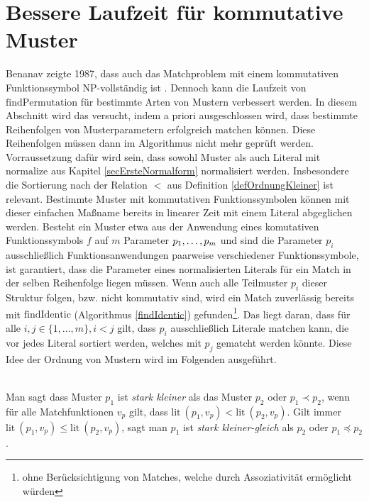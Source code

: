 \section{Bessere Laufzeit für kommutative Muster} \label{subsecCMuster}

Benanav zeigte 1987, dass auch das Matchproblem mit einem kommutativen Funktionssymbol NP-vollständig ist \cite{NPHardMatching}. Dennoch kann die Laufzeit von $\mathrm{findPermutation}$ für bestimmte Arten von Mustern verbessert werden. In diesem Abschnitt wird das versucht, indem a priori ausgeschlossen wird, dass bestimmte Reihenfolgen von Musterparametern erfolgreich matchen können. Diese Reihenfolgen müssen dann im Algorithmus nicht mehr geprüft werden.
Vorraussetzung dafür wird sein, dass sowohl Muster als auch Literal mit $\mathrm{normalize}$ aus Kapitel \ref{secErsteNormalform} normalisiert werden. Insbesondere die Sortierung nach der Relation $<$ aus Definition \ref{defOrdnungKleiner} ist relevant.
Bestimmte Muster mit kommutativen Funktionssymbolen können mit dieser einfachen Maßname bereits in linearer Zeit mit einem Literal abgeglichen werden. Besteht ein Muster etwa aus der Anwendung eines komutativen Funktionssymbols $f$ auf $m$ Parameter ${p}_{1}, \dots, {p}_{m}$ und sind die Parameter $p_i$ ausschließlich Funktionsanwendungen paarweise verschiedener Funktionssymbole, ist garantiert, dass die Parameter eines normalisierten Literals für ein Match in der selben Reihenfolge liegen müssen. Wenn auch alle Teilmuster $p_i$ dieser Struktur folgen, bzw. nicht kommutativ sind, wird ein Match zuverlässig bereits mit $\mathrm{findIdentic}$ (Algorithmus \ref{findIdentic}) gefunden\footnote{ohne Berücksichtigung von Matches, welche durch Assoziativität ermöglicht würden}. Das liegt daran, dass für alle $i, j \in \{1, \dots, m\}, i < j$ gilt, dass $p_i$ ausschließlich Literale matchen kann, die vor jedes Literal sortiert werden, welches mit $p_j$ gematcht werden könnte. Diese Idee der Ordnung von Mustern wird im Folgenden ausgeführt.


\begin{definition}~\\
Man sagt dass Muster $p_1$ ist \emph{stark kleiner} als das Muster $p_2$ oder $p_1 \prec p_2$, wenn für alle Matchfunktionen $v_p$ gilt, dass $\mathrm{lit}~(p_1, v_p) < \mathrm{lit}~(p_2, v_p)$. Gilt immer $\mathrm{lit}~(p_1, v_p) \leq \mathrm{lit}~(p_2, v_p)$, sagt man $p_1$ ist \emph{stark kleiner-gleich} als $p_2$ oder $p_1 \preceq p_2$.
\end{definition}


